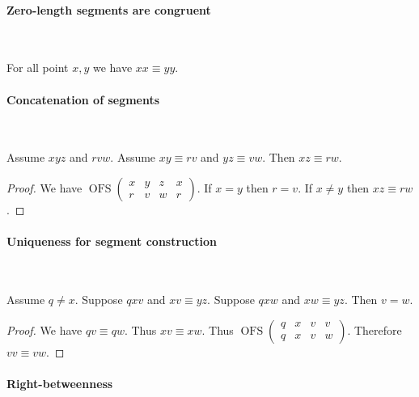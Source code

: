 \documentclass[10pt,a4paper,parskip=half,numbers=endperiod,headings=standardclasses,parskip]{scrbook}
\newcommand{\Cong}[4]{#1 #2 \equiv #3 #4}
\newcommand{\Betw}[3]{#1 #2 #3}
\newcommand{\OFS}[8]{\operatorname{OFS}
\left(\begin{smallmatrix}%
#1 & #2 & #3 & #4 \\
#5 & #6 & #7 & #8
\end{smallmatrix}\right)%
}
\begin{document}
  \paragraph{Zero-length segments are congruent}\

  \begin{forthel}
    \begin{lemma} %
      For all point $x, y$ we have $\Cong{x}{x}{y}{y}$.
    \end{lemma}
  \end{forthel}


  \paragraph{Concatenation of segments}\

  \begin{forthel}
    \begin{lemma} %
      Assume $\Betw{x}{y}{z}$ and $\Betw{r}{v}{w}$.
      Assume $\Cong{x}{y}{r}{v}$ and $\Cong{y}{z}{v}{w}$.
      Then $\Cong{x}{z}{r}{w}$.
    \end{lemma}
    \begin{proof}
      We have $\OFS{x}{y}{z}{x}{r}{v}{w}{r}$. %
      If $x = y$ then $r = v$.                %
      If $x \neq y$ then $\Cong{x}{z}{r}{w}$. %
    \end{proof}
  \end{forthel}


  \paragraph{Uniqueness for segment construction}\

  \begin{forthel}
    \begin{lemma} %
      Assume $q \neq x$.
      Suppose $\Betw{q}{x}{v}$ and $\Cong{x}{v}{y}{z}$.
      Suppose $\Betw{q}{x}{w}$ and $\Cong{x}{w}{y}{z}$.
      Then $v = w$.
    \end{lemma}
    \begin{proof}
      We have $\Cong{q}{v}{q}{w}$.
      Thus $\Cong{x}{v}{x}{w}$.
      Thus $\OFS{q}{x}{v}{v}{q}{x}{v}{w}$.
      Therefore $\Cong{v}{v}{v}{w}$.
    \end{proof}
  \end{forthel}


  \paragraph{Right-betweenness}\
\end{document}

